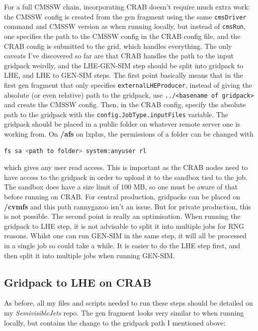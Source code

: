 For a full CMSSW chain, incorporating CRAB doesn't require much extra work: the CMSSW config is created from the gen fragment using the same \texttt{cmsDriver} command and CMSSW version as when running locally, but instead of \texttt{cmsRun}, one specifies the path to the CMSSW config in the CRAB config file, and the CRAB config is submitted to the grid, which handles everything. The only caveats I've discovered so far are that CRAB handles the path to the input gridpack weirdly, and the LHE-GEN-SIM step should be split into gridpack to LHE, and LHE to GEN-SIM steps. The first point basically means that in the first gen fragment that only specifies \texttt{externalLHEProducer}, instead of giving the absolute (or even relative) path to the gridpack, use \texttt{../<basename of gridpack>} and create the CMSSW config. Then, in the CRAB config, specify the absolute path to the gridpack with the \texttt{config.JobType.inputFiles} variable. The gridpack should be placed in a public folder on whatever remote server one is working from. On \textbf{/afs} on lxplus, the permissions of a folder can be changed with

\begin{lstlisting}[belowskip=-0.7cm, language=sh, numbers=none]
fs sa <path to folder> system:anyuser rl
\end{lstlisting}

which gives any user read access. This is important as the CRAB nodes need to have access to the gridpack in order to upload it to the sandbox tied to the job. The sandbox does have a size limit of 100 MB, so one must be aware of that before running on CRAB. For central production, gridpacks can be placed on \textbf{/cvmfs} and this path rannygazoo isn't an issue. But for private production, this is not possible. The second point is really an optimisation. When running the gridpack to LHE step, it is not advisable to split it into multiple jobs for RNG reasons. Whilst one can run GEN-SIM in the same step, it will all be processed in a single job so could take a while. It is easier to do the LHE step first, and then split it into multiple jobs when running GEN-SIM.


\subsection{Gridpack to LHE on CRAB}

As before, all my files and scripts needed to run these steps should be detailed on my \emph{SemivisibleJets} repo. The gen fragment looks very similar to when running locally, but contains the change to the gridpack path I mentioned above:


